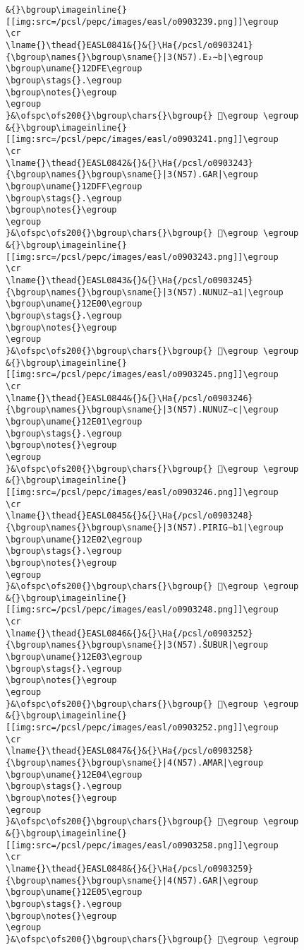 \begin{verbatim}
&{}\bgroup\imageinline{}[[img:src=/pcsl/pepc/images/easl/o0903239.png]]\egroup
\cr
\lname{}\thead{}EASL0841&{}&{}\Ha{/pcsl/o0903241}{\bgroup\names{}\bgroup\sname{}|3(N57).E₂∼b|\egroup
\bgroup\uname{}12DFE\egroup
\bgroup\stags{}.\egroup
\bgroup\notes{}\egroup
\egroup
}&\ofspc\ofs200{}\bgroup\chars{}\bgroup{} 𒷾\egroup \egroup
&{}\bgroup\imageinline{}[[img:src=/pcsl/pepc/images/easl/o0903241.png]]\egroup
\cr
\lname{}\thead{}EASL0842&{}&{}\Ha{/pcsl/o0903243}{\bgroup\names{}\bgroup\sname{}|3(N57).GAR|\egroup
\bgroup\uname{}12DFF\egroup
\bgroup\stags{}.\egroup
\bgroup\notes{}\egroup
\egroup
}&\ofspc\ofs200{}\bgroup\chars{}\bgroup{} 𒷿\egroup \egroup
&{}\bgroup\imageinline{}[[img:src=/pcsl/pepc/images/easl/o0903243.png]]\egroup
\cr
\lname{}\thead{}EASL0843&{}&{}\Ha{/pcsl/o0903245}{\bgroup\names{}\bgroup\sname{}|3(N57).NUNUZ∼a1|\egroup
\bgroup\uname{}12E00\egroup
\bgroup\stags{}.\egroup
\bgroup\notes{}\egroup
\egroup
}&\ofspc\ofs200{}\bgroup\chars{}\bgroup{} 𒸀\egroup \egroup
&{}\bgroup\imageinline{}[[img:src=/pcsl/pepc/images/easl/o0903245.png]]\egroup
\cr
\lname{}\thead{}EASL0844&{}&{}\Ha{/pcsl/o0903246}{\bgroup\names{}\bgroup\sname{}|3(N57).NUNUZ∼c|\egroup
\bgroup\uname{}12E01\egroup
\bgroup\stags{}.\egroup
\bgroup\notes{}\egroup
\egroup
}&\ofspc\ofs200{}\bgroup\chars{}\bgroup{} 𒸁\egroup \egroup
&{}\bgroup\imageinline{}[[img:src=/pcsl/pepc/images/easl/o0903246.png]]\egroup
\cr
\lname{}\thead{}EASL0845&{}&{}\Ha{/pcsl/o0903248}{\bgroup\names{}\bgroup\sname{}|3(N57).PIRIG∼b1|\egroup
\bgroup\uname{}12E02\egroup
\bgroup\stags{}.\egroup
\bgroup\notes{}\egroup
\egroup
}&\ofspc\ofs200{}\bgroup\chars{}\bgroup{} 𒸂\egroup \egroup
&{}\bgroup\imageinline{}[[img:src=/pcsl/pepc/images/easl/o0903248.png]]\egroup
\cr
\lname{}\thead{}EASL0846&{}&{}\Ha{/pcsl/o0903252}{\bgroup\names{}\bgroup\sname{}|3(N57).ŠUBUR|\egroup
\bgroup\uname{}12E03\egroup
\bgroup\stags{}.\egroup
\bgroup\notes{}\egroup
\egroup
}&\ofspc\ofs200{}\bgroup\chars{}\bgroup{} 𒸃\egroup \egroup
&{}\bgroup\imageinline{}[[img:src=/pcsl/pepc/images/easl/o0903252.png]]\egroup
\cr
\lname{}\thead{}EASL0847&{}&{}\Ha{/pcsl/o0903258}{\bgroup\names{}\bgroup\sname{}|4(N57).AMAR|\egroup
\bgroup\uname{}12E04\egroup
\bgroup\stags{}.\egroup
\bgroup\notes{}\egroup
\egroup
}&\ofspc\ofs200{}\bgroup\chars{}\bgroup{} 𒸄\egroup \egroup
&{}\bgroup\imageinline{}[[img:src=/pcsl/pepc/images/easl/o0903258.png]]\egroup
\cr
\lname{}\thead{}EASL0848&{}&{}\Ha{/pcsl/o0903259}{\bgroup\names{}\bgroup\sname{}|4(N57).GAR|\egroup
\bgroup\uname{}12E05\egroup
\bgroup\stags{}.\egroup
\bgroup\notes{}\egroup
\egroup
}&\ofspc\ofs200{}\bgroup\chars{}\bgroup{} 𒸅\egroup \egroup

\end{verbatim}
